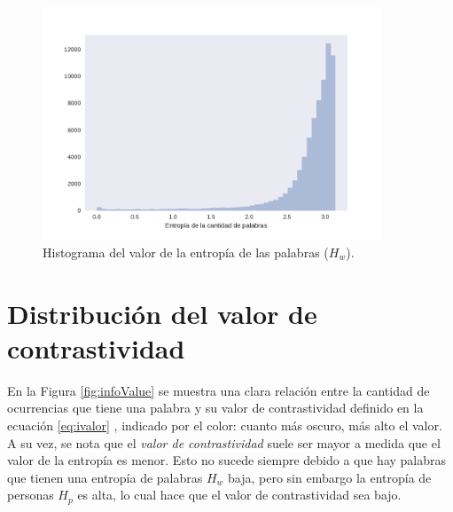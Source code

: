 \begin{figure}[ht]
\centering
\includegraphics[width=0.9\textwidth]{./images/DistribucionEntropia.pdf}
\caption{Histograma del valor de la entropía de las palabras ($H_w$).} 
\label{fig:entropiaPalabras} 
\end{figure}

\section{Distribución del valor de contrastividad}
\label{sec:ValorDeLaInformacion}
En la Figura \ref{fig:infoValue} se muestra una clara relación entre la cantidad de ocurrencias que tiene una palabra y su valor de contrastividad definido en la ecuación \ref{eq:ivalor} , indicado por el color: cuanto más oscuro, más alto el valor. A su vez, se nota que el \textit{valor de contrastividad} suele ser mayor a medida que el valor de la entropía es menor. Esto no sucede siempre debido a que hay palabras que tienen una entropía de palabras $H_w$ baja, pero sin embargo la entropía de personas $H_p$ es alta, lo cual hace que el valor de contrastividad sea bajo.



